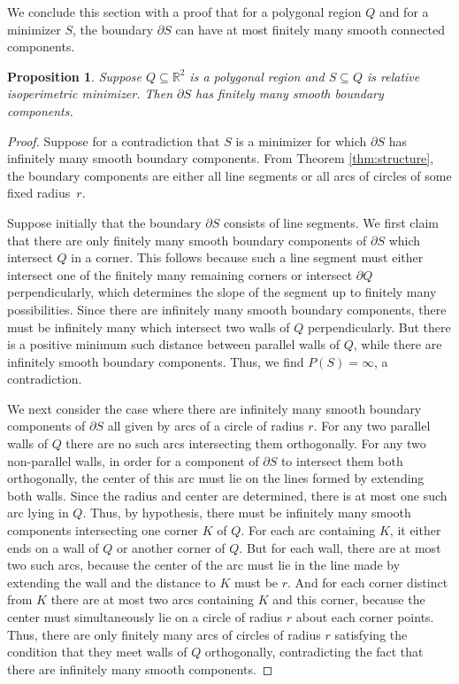 \documentclass[leqno]{article}
\numberwithin{equation}{section}
\theoremstyle{definition}
\theoremstyle{remark}
\theoremstyle{plain}
\newtheorem{proposition}[equation]{Proposition}
\begin{document}
We conclude this section with a proof that for a polygonal region $Q$ and for a minimizer $S$, the boundary $\partial S$ can have at most finitely many smooth connected components.


\begin{proposition}
\label{prop:finiteboundary}
Suppose $Q\subseteq\mathbb{R}^2$ is a polygonal region and $S \subseteq Q$ is relative isoperimetric minimizer.  Then $\partial S$ has finitely many smooth boundary components.
\end{proposition}

\begin{proof}

Suppose for a contradiction that $S$ is a minimizer for which $\partial S$ has infinitely many smooth boundary components.  From Theorem \ref{thm:structure}, the boundary components are either all line segments or all arcs of circles of some fixed radius~$r$.

Suppose initially that the boundary $\partial S$ consists of line segments.  We first claim that there are only finitely many smooth boundary components of $\partial S$ which intersect $Q$ in a corner.  This follows because such a line segment must either intersect one of the finitely many remaining corners or intersect $\partial Q$ perpendicularly, which determines the slope of the segment up to finitely many possibilities.  Since there are infinitely many smooth boundary components, there must be infinitely many which intersect two walls of $Q$ perpendicularly.  But there is a positive minimum such distance between parallel walls of $Q$, while there are infinitely smooth boundary components.  Thus, we find $P(S) = \infty$, a contradiction. 


We next consider the case where there are infinitely many smooth boundary components of $\partial S$ all given by arcs of a circle of radius $r$.  For any two parallel walls of $Q$ there are no such arcs intersecting them orthogonally.  For any two non-parallel walls, in order for a component of $\partial S$ to intersect them both orthogonally, the center of this arc must lie on the lines formed by extending both walls.  Since the radius and center are determined, there is at most one such arc lying in $Q$.  Thus, by hypothesis, there must be infinitely many smooth components intersecting one corner $K$ of $Q$.  For each arc containing $K$, it either ends on a wall of $Q$ or another corner of $Q$.  But for each wall, there are at most two such arcs, because the center of the arc must lie in the line made by extending the wall and the distance to $K$ must be $r$.  And for each corner distinct from $K$ there are at most two arcs containing $K$ and this corner, because the center must simultaneously lie on a circle of radius $r$ about each corner points.  Thus, there are only finitely many arcs of circles of radius $r$ satisfying the condition that they meet walls of $Q$ orthogonally, contradicting the fact that there are infinitely many smooth components.


\end{proof}
\end{document}
